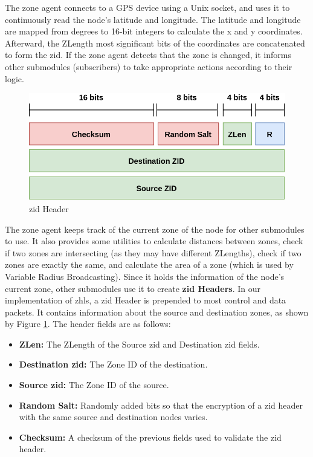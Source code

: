 The zone agent connects to a GPS device using a Unix socket, and uses it to continuously read the node's latitude and longitude. The latitude and longitude are mapped from degrees to 16-bit integers to calculate the x and y coordinates. Afterward, the ZLength most significant bits of the coordinates are concatenated to form the \acrfull{zid}. If the zone agent detects that the zone is changed, it informs other submodules (subscribers) to take appropriate actions according to their logic.

\begin{figure}[!htb]
    \centering
    \includegraphics[width=0.8\linewidth]{images/zid.png}
    \caption{\acrshort{zid} Header}
    \label{fig:zid}
\end{figure}

The zone agent keeps track of the current zone of the node for other submodules to use. It also provides some utilities to calculate distances between zones, check if two zones are intersecting (as they may have different ZLengths), check if two zones are exactly the same, and calculate the area of a zone (which is used by Variable Radius Broadcasting). Since it holds the information of the node's current zone, other submodules use it to create \textbf{\acrshort{zid} Headers}. In our implementation of \acrshort{zhls}, a \acrshort{zid} Header is prepended to most control and data packets. It contains information about the source and destination zones, as shown by Figure \ref{fig:zid}. The header fields are as follows:
\begin{itemize}[itemsep=1pt, topsep=5pt]
    \item \textbf{ZLen:} The ZLength of the Source \acrshort{zid} and Destination \acrshort{zid} fields.
    \item \textbf{Destination \acrshort{zid}:} The Zone ID of the destination.
    \item \textbf{Source \acrshort{zid}:} The Zone ID of the source.
    \item \textbf{Random Salt:} Randomly added bits so that the encryption of a \acrshort{zid} header with the same source and destination nodes varies.
    \item \textbf{Checksum:} A checksum of the previous fields used to validate the \acrshort{zid} header.
\end{itemize}

